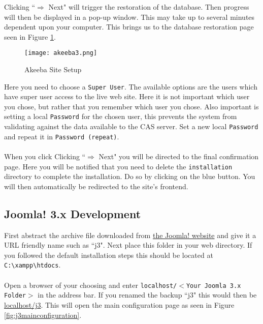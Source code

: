\noindent
Clicking ``$\Rightarrow$ Next" will trigger the restoration of the database. Then progress will then be displayed in a pop-up window. This may take up to several minutes dependent upon your computer. This brings us to the database restoration page seen in Figure \ref{fig:akeebasitesetup}.

\newpage

\begin{figure}[h] 
	\centering
	\texttt{[image: akeeba3.png]}
	\caption{Akeeba Site Setup}
	\label{fig:akeebasitesetup}
\end{figure}

\noindent
Here you need to choose a \texttt{Super User}. The available options are the users which have super user access to the live web site. Here it is not important which user you chose, but rather that you remember which user you chose. Also important is setting a local \texttt{Password} for the chosen user, this prevents the system from validating against the data available to the CAS server. Set a new local  \texttt{Password} and repeat it in  \texttt{Password (repeat)}.\\
\\
When you click Clicking ``$\Rightarrow$ Next" you will be directed to the final confirmation page. Here you will be notified that you need to delete the \texttt{installation} directory to complete the installation. Do so by clicking on the blue button. You will then automatically be redirected to the site's frontend.

\subsection{Joomla! 3.x Development}

First abstract the archive file downloaded from \href{http://www.joomla.org/download.html}{the Joomla! website} and give it a URL friendly name such as ``j3". Next place this folder in your web directory. If you followed the default installation steps this should be located at \texttt{C:\textbackslash xampp\textbackslash htdocs}.\\
\\
Open a browser of your choosing and enter \texttt{localhost/$<$Your Joomla 3.x Folder$>$} in the address bar. If you renamed the backup ``j3" this would then be \url{localhost/j3}. This will open the main configuration page as seen in Figure \ref{fig:j3mainconfiguration}.

\newpage

